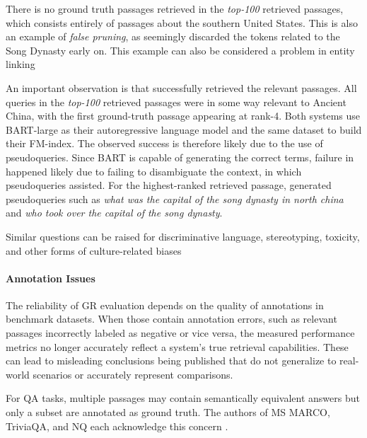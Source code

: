 There is no ground truth passages retrieved in the \textit{top-100} retrieved passages, which consists entirely of passages about the southern United States. This is also an example of \textit{false pruning}, as seemingly %
discarded the tokens related to the Song Dynasty early on. This example can also be considered a problem in entity linking %

An important observation is that  successfully retrieved the relevant passages. All queries in the \textit{top-100} retrieved passages were in some way relevant to Ancient China, with the first ground-truth passage appearing at rank-4. Both systems use BART-large as their autoregressive language model and the same dataset to build their FM-index. The observed success is therefore likely due to the use of pseudoqueries. Since BART is capable of generating the correct terms, failure in  happened likely due to failing to disambiguate the context, in which pseudoqueries assisted. For the highest-ranked retrieved  passage,  generated pseudoqueries such as \textit{what was the capital of the song dynasty in north china} and \textit{who took over the capital of the song dynasty}.


Similar questions can be raised for discriminative language, stereotyping, toxicity, and other forms of culture-related biases \cite{gallegos-bias-and}


\paragraph{Annotation Issues}
\label{sec:annotation}



The reliability of GR evaluation depends on the quality of  annotations in benchmark datasets. When those contain annotation errors, such as relevant passages incorrectly labeled as negative or vice versa, the measured performance metrics no longer accurately reflect a system's true retrieval capabilities. These can lead to misleading conclusions being published that do not generalize to real-world scenarios or accurately represent comparisons.

For QA tasks, multiple passages may contain semantically equivalent answers but only a subset are annotated as ground truth. The authors of MS MARCO, TriviaQA, and NQ each acknowledge this concern \cite{payal-bajaj-ms-marco,joshi-triviaqa-a,kwiatkowski-natural-questions}.

